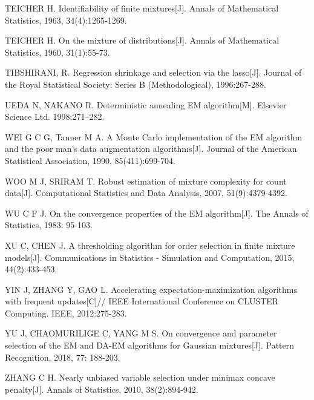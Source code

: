 \documentclass[a4paper,12pt,openany,oneside,utf-8]{ctexbook}
\newcommand{\sanhao}{\fontsize{15.75pt}{\baselineskip}\selectfont}
\begin{document}
\begin{enumerate}[{[}1{]}]
\item 	TEICHER H. Identifiability of finite mixtures[J]. Annals of Mathematical Statistics, 1963, 34(4):1265-1269.
\item 	TEICHER H. On the mixture of distributions[J]. Annals of Mathematical Statistics, 1960, 31(1):55-73.
\item 	TIBSHIRANI, R. Regression shrinkage and selection via the lasso[J]. Journal of the Royal Statistical Society: Series B (Methodological), 1996:267-288.
\item 	UEDA N, NAKANO R. Deterministic annealing EM algorithm[M]. Elsevier Science Ltd. 1998:271–282.
\item 	WEI G C G, Tanner M A. A Monte Carlo implementation of the EM algorithm and the poor man's data augmentation algorithms[J]. Journal of the American Statistical Association, 1990, 85(411):699-704.
\item 	WOO M J, SRIRAM T. Robust estimation of mixture complexity for count data[J]. Computational Statistics and Data Analysis, 2007, 51(9):4379-4392.
\item 	WU C F J. On the convergence properties of the EM algorithm[J]. The Annals of Statistics, 1983: 95-103.
\item 	XU C, CHEN J. A thresholding algorithm for order selection in finite mixture models[J]. Communications in Statistics - Simulation and Computation, 2015, 44(2):433-453.
\item 	YIN J, ZHANG Y, GAO L. Accelerating expectation-maximization algorithms with frequent updates[C]// IEEE International Conference on CLUSTER Computing. IEEE, 2012:275-283.
\item 	YU J, CHAOMURILIGE C, YANG M S. On convergence and parameter selection of the EM and DA-EM algorithms for Gaussian mixtures[J]. Pattern Recognition, 2018, 77: 188-203.
\item 	ZHANG C H. Nearly unbiased variable selection under minimax concave penalty[J]. Annals of Statistics, 2010, 38(2):894-942.

\end{enumerate}


\newpage
\pagestyle{fancy}
\begin{center}
\heiti\sanhao {硕士研究生期间的科研成果}
\end{center}

\end{document}
